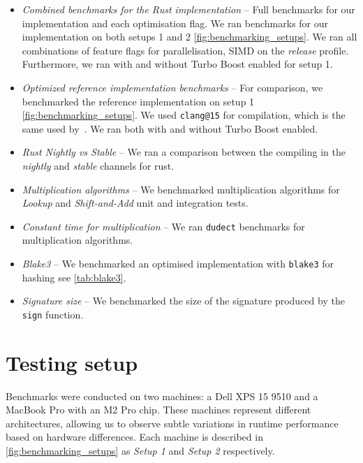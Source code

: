 \documentclass[11pt]{report}
\theoremstyle{definition}
\theoremstyle{plain}
\begin{document}
\begin{itemize}[parsep=0pt, itemsep=3pt]
  \item \textit{Combined benchmarks for the Rust implementation} -- Full benchmarks for our implementation and each optimisation flag. We ran benchmarks for our implementation on both setups 1 and 2 \autoref{fig:benchmarking_setups}. We ran all combinations of feature flags for parallelisation, SIMD on the \textit{release} profile. Furthermore, we ran with and without Turbo Boost enabled for setup 1.
  \item \textit{Optimized reference implementation benchmarks} -- For comparison, we benchmarked the reference implementation on setup 1 \autoref{fig:benchmarking_setups}. We used \texttt{clang@15} for compilation, which is the same used by~\cite{aguilarsyndrome11}. We ran both with and without Turbo Boost enabled.
  \item \textit{Rust Nightly vs Stable} -- We ran a comparison between the compiling in the \textit{nightly} and \textit{stable} channels for rust.
  \item \textit{Multiplication algorithms} -- We benchmarked multiplication algorithms for \textit{Lookup} and \textit{Shift-and-Add} unit and integration tests.
  \item \textit{Constant time for multiplication} -- We ran \texttt{dudect} benchmarks for multiplication algorithms.
  \item \textit{Blake3} -- We benchmarked an optimised implementation with \texttt{blake3} for hashing see \autoref{tab:blake3}.
  \item \textit{Signature size} -- We benchmarked the size of the signature produced by the \texttt{sign} function.
\end{itemize}

\section{Testing setup}\label{sub:testing_setup}

Benchmarks were conducted on two machines: a Dell XPS 15 9510 and a MacBook Pro with an M2 Pro chip. These machines represent different architectures, allowing us to observe subtle variations in runtime performance based on hardware differences. Each machine is described in \autoref{fig:benchmarking_setups} as \textit{Setup 1} and \textit{Setup 2} respectively.
\end{document}
